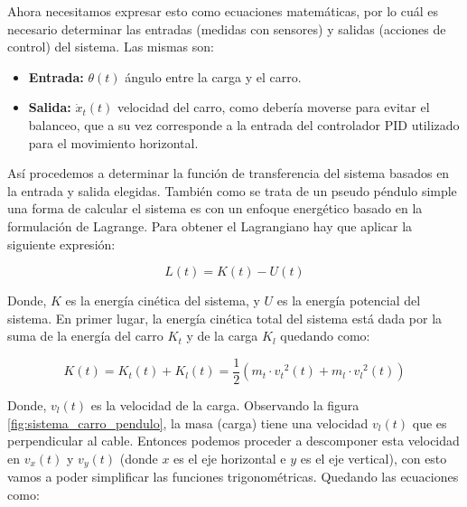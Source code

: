 \documentclass[11pt]{article}
\begin{document}
Ahora necesitamos expresar esto como ecuaciones matemáticas, por lo cuál es necesario determinar las entradas (medidas con sensores) y salidas (acciones de control) del sistema. Las mismas son:

\begin{itemize}
	\item \textbf{Entrada:} $\theta (t)$ ángulo entre la carga y el carro.
	\item \textbf{Salida:} $\dot{x}_{t}(t)$ velocidad del carro, como debería moverse para evitar el balanceo, que a su vez corresponde a la entrada del controlador PID utilizado para el movimiento horizontal.
\end{itemize}

Así procedemos a determinar la función de transferencia del sistema basados en la entrada y salida elegidas. También como se trata de un pseudo péndulo simple una forma de calcular el sistema es con un enfoque energético basado en la formulación de Lagrange. Para obtener el Lagrangiano hay que aplicar la siguiente expresión:

\begin{equation}
	\label{eq:lagrangiano}
	L(t)=K(t)-U(t)
\end{equation}

Donde, $K$ es la energía cinética del sistema, y $U$ es la energía potencial del sistema. En primer lugar, la energía cinética total del sistema está dada por la suma de la energía del carro $K_{t}$ y de la carga $K_{l}$ quedando como:

\begin{equation}
	\label{eq:lagrangiano_energia_cinetica}
	K(t)=K_{t}(t)+K_{l}(t)=\frac{1}{2}\left ( m_{t}\cdot {v_{t}}^2(t)+m_{l}\cdot {v_{l}}^2(t) \right )
\end{equation}

Donde, $v_{l}(t)$ es la velocidad de la carga. Observando la figura \ref{fig:sistema_carro_pendulo}, la masa (carga) tiene una velocidad $v_{l}(t)$ que es perpendicular al cable. Entonces podemos proceder a descomponer esta velocidad en $v_{x}(t)$ y $v_{y}(t)$ (donde $x$ es el eje horizontal e $y$ es el eje vertical), con esto vamos a poder simplificar las funciones trigonométricas. Quedando las ecuaciones como:
\end{document}
